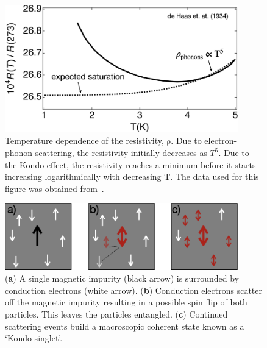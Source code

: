\begin{figure}[!hbt]
 \begin{center}
  \includegraphics[width=0.9\textwidth]{figures/ch2/crop_FiguresMaster.008.png}
  \caption[Kondo effect in bulk materials]{\label{fig:ch2/kondo_bulkmetal} 
  Temperature dependence of the resistivity, $\mathrm{\rho}$. Due to electron-phonon scattering, the resistivity initially decreases as $T^5$. Due to the Kondo effect, the resistivity reaches a minimum before it starts increasing logarithmically with decreasing $\mathrm{T}$. The data used for this figure was obtained from~\cite{de_haas}.
   }
 \end{center}
\end{figure}


\begin{figure}[!hbt]
 \begin{center}
  \includegraphics[width=0.9\textwidth]{figures/ch2/crop_FiguresMaster.009.png}
  \caption[Kondo effect illustration]{\label{fig:ch2/kondo_bulkdiagram} 
  (\textbf{a}) A single magnetic impurity (black arrow) is surrounded by conduction electrons (white arrow). (\textbf{b}) Conduction electrons scatter off the magnetic impurity resulting in a possible spin flip of both particles. This leaves the particles entangled. (\textbf{c}) Continued scattering events build a macroscopic coherent state known as a `Kondo singlet'.
   }
 \end{center}
\end{figure}


